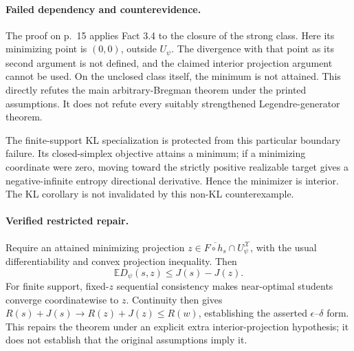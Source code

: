 \documentclass[10pt]{article}
\begin{document}
\paragraph*{Failed dependency and counterevidence.}\mbox{}\par
The proof on p. 15 applies Fact 3.4 to the closure of the strong class. Here its minimizing point is \((0,0)\), outside \(U_\psi\). The divergence with that point as its second argument is not defined, and the claimed interior projection argument cannot be used. On the unclosed class itself, the minimum is not attained. This directly refutes the main arbitrary-Bregman theorem under the printed assumptions. It does not refute every suitably strengthened Legendre-generator theorem.\par
The finite-support KL specialization is protected from this particular boundary failure. Its closed-simplex objective attains a minimum; if a minimizing coordinate were zero, moving toward the strictly positive realizable target gives a negative-infinite entropy directional derivative. Hence the minimizer is interior. The KL corollary is not invalidated by this non-KL counterexample.\par
\paragraph*{Verified restricted repair.}\mbox{}\par
Require an attained minimizing projection \(z\in\overline{F\circ h_s}\cap U_\psi^{\mathcal X}\), with the usual differentiability and convex projection inequality. Then \[\mathbb E D_\psi(s,z)\leq J(s)-J(z).\] For finite support, fixed-\(z\) sequential consistency makes near-optimal students converge coordinatewise to \(z\). Continuity then gives \(R(s)+J(s)\to R(z)+J(z)\leq R(w)\), establishing the asserted \(\epsilon\)–\(\delta\) form. This repairs the theorem under an explicit extra interior-projection hypothesis; it does not establish that the original assumptions imply it.\par
\end{document}
